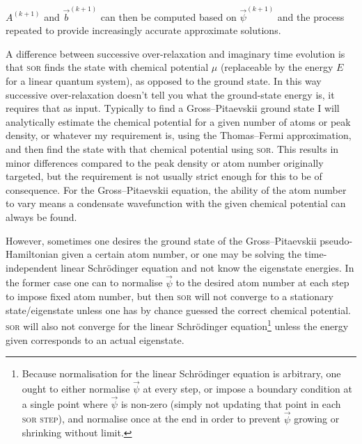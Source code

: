 $A^{(k+1)}$ and $\vec b^{(k+1)}$ can then be computed based on $\vec\psi^{(k+1)}$ and the process repeated to provide increasingly accurate approximate solutions.

A difference between successive over-relaxation and imaginary time evolution is that \textsc{sor} finds the state with chemical potential $\mu$ (replaceable by the energy $E$ for a linear quantum system), as opposed to the ground state. In this way successive over-relaxation doesn't tell you what the ground-state energy is, it requires that as input. Typically to find a Gross--Pitaevskii ground state I will analytically estimate the chemical potential for a given number of atoms or peak density, or whatever my requirement is, using the Thomas--Fermi approximation, and then find the state with that chemical potential using \textsc{sor}. This results in minor differences compared to the peak density or atom number originally targeted, but the requirement is not usually strict enough for this to be of consequence. For the Gross--Pitaevskii equation, the ability of the atom number to vary means a condensate wavefunction with the given chemical potential can always be found.

However, sometimes one desires the ground state of the Gross--Pitaevskii pseudo-Hamiltonian given a certain atom number, or one may be solving the time-independent linear Schr\"odinger equation and not know the eigenstate energies. In the former case one can to normalise $\vec\psi$ to the desired atom number at each step to impose fixed atom number, but then \textsc{sor} will not converge to a stationary state/eigenstate unless one has by chance guessed the correct chemical potential. \textsc{sor} will also not converge for the linear Schr\"odinger equation\footnote{Because normalisation for the linear Schr\"odinger equation is arbitrary, one ought to either normalise $\vec\psi$ at every step, or impose a boundary condition at a single point where $\vec\psi$ is non-zero (simply not updating that point in each \textsc{sor step}), and normalise once at the end in order to prevent $\vec\psi$ growing or shrinking without limit.} unless the energy given corresponds to an actual eigenstate.

